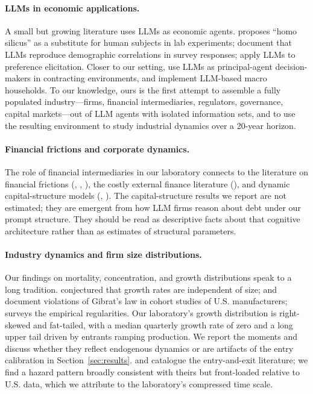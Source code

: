 \documentclass[11pt]{article}
\begin{document}
\paragraph{LLMs in economic applications.} A small but growing literature
uses LLMs as economic agents. \citet{horton2023large} proposes
``homo silicus'' as a substitute for human subjects in lab experiments;
\citet{argyle2023out} document that LLMs reproduce demographic
correlations in survey responses; \citet{brand2023using} apply LLMs to
preference elicitation. Closer to our setting,
\citet{ross2024llm} use LLMs as principal-agent decision-makers in
contracting environments, and \citet{li2023}\nocite{li2023}
implement LLM-based macro households. To our knowledge, ours is the first
attempt to assemble a fully populated industry---firms, financial
intermediaries, regulators, governance, capital markets---out of LLM
agents with isolated information sets, and to use the resulting
environment to study industrial dynamics over a 20-year horizon.

\paragraph{Financial frictions and corporate dynamics.} The role of
financial intermediaries in our laboratory connects to the literature on
financial frictions (\citealp{bernankegertler1989}, \citealp{kiyotakimoore1997},
\citealp{rampinjviswanathan2010}), the costly external finance literature
(\citealp{myersmajluf1984}), and dynamic capital-structure models
(\citealp{lelandtoft1996}, \citealp{strebulaev2007}). The capital-structure
results we report are not estimated; they are emergent from how LLM
firms reason about debt under our prompt structure. They should be read
as descriptive facts about that cognitive architecture rather than as
estimates of structural parameters.

\paragraph{Industry dynamics and firm size distributions.} Our findings
on mortality, concentration, and growth distributions speak to a long
tradition. \citet{gibrat1931} conjectured that growth rates are
independent of size; \citet{hall1987relationship} and
\citet{evans1987tests} document violations of Gibrat's law in cohort
studies of U.S. manufacturers; \citet{sutton1997gibrat} surveys the
empirical regularities. Our laboratory's growth distribution is
right-skewed and fat-tailed, with a median quarterly growth rate of
zero and a long upper tail driven by entrants ramping production. We
report the moments and discuss whether they reflect endogenous
dynamics or are artifacts of the entry calibration in
Section~\ref{sec:results}. \citet{caves1998industrial} and
\citet{geroski1995entries} catalogue the entry-and-exit literature; we
find a hazard pattern broadly consistent with theirs but front-loaded
relative to U.S. data, which we attribute to the laboratory's
compressed time scale.
\end{document}
